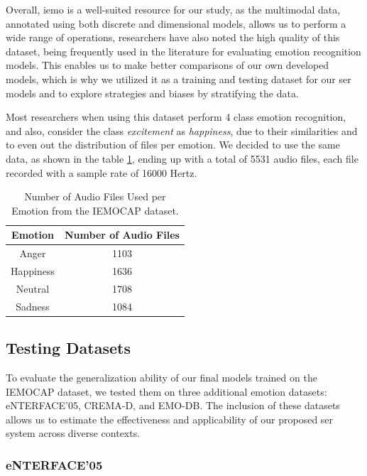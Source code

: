 Overall, \ac{iemo} is a well-suited resource for our study, as the multimodal data, annotated using both discrete and dimensional models, allows us to perform a wide range of operations, researchers have also noted the high quality of this dataset, being frequently used in the literature for evaluating emotion recognition models. This enables us to make better comparisons of our own developed models, which is why we utilized it as a training and testing dataset for our \ac{ser} models and to explore strategies and biases by stratifying the data.

Most researchers when using this dataset perform 4 class emotion recognition, and also, consider the class \textit{excitement} as \textit{happiness}, due to their similarities and to even out the distribution of files per emotion. We decided to use the same data, as shown in the table \ref{tab:dataDist}, ending up with a total of 5531 audio files, each file recorded with a sample rate of 16000 Hertz.

\begin{table}[H]
	\centering
	\caption{Number of Audio Files Used per Emotion from the IEMOCAP dataset.}
	\label{tab:dataDist}
	\begin{tabular}{cc}
		\toprule
		Emotion & Number of Audio Files \\
		\midrule
		Anger 		&  1103\\
		Happiness 	&  1636\\
		Neutral	 	&  1708\\
		Sadness 	&  1084\\
		\bottomrule
	\end{tabular}
\end{table}


\subsection{Testing Datasets}

To evaluate the generalization ability of our final models trained on the IEMOCAP dataset, we tested them on three additional emotion datasets: eNTERFACE’05, CREMA-D, and EMO-DB. The inclusion of these datasets allows us to estimate the effectiveness and applicability of our proposed \ac{ser} system across diverse contexts.

\subsubsection{eNTERFACE'05}

